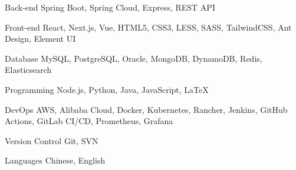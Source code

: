 

\begin{cvskills}

  \cvskill
  {Back-end} %
  {Spring Boot, Spring Cloud, Express, REST API} %

  \cvskill
  {Front-end} %
  {React, Next.js, Vue, HTML5, CSS3, LESS, SASS, TailwindCSS, Ant Design, Element UI} %

  \cvskill
  {Database} %
  {MySQL, PostgreSQL, Oracle, MongoDB, DynamoDB, Redis, Elasticsearch} %

  \cvskill
  {Programming} %
  {Node.js, Python, Java, JavaScript, LaTeX} %

  \cvskill
  {DevOps} %
  {AWS, Alibaba Cloud, Docker, Kubernetes, Rancher, Jenkins, GitHub Actions, GitLab CI/CD, Prometheus, Grafana} %

  \cvskill
  {Version Control} %
  {Git, SVN} %

  \cvskill
  {Languages} %
  {Chinese, English} %

\end{cvskills}
